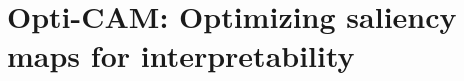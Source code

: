 \chapter{Opti-CAM: Optimizing saliency maps for interpretability}
\chaptertoc{}
\label{ch:opticam}






